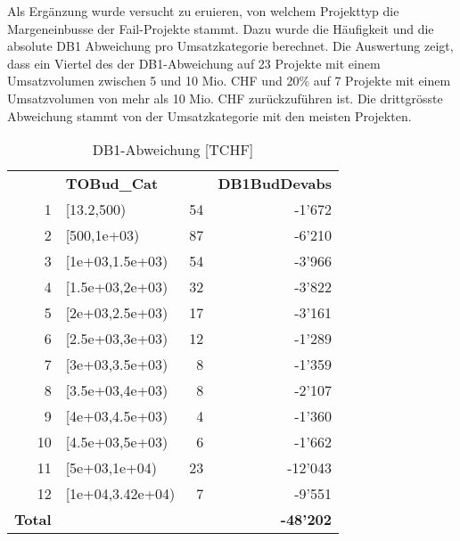Als Ergänzung wurde versucht zu eruieren, von welchem Projekttyp die Margeneinbusse der Fail-Projekte stammt. Dazu wurde die Häufigkeit und die absolute DB1 Abweichung pro Umsatzkategorie berechnet. Die Auswertung zeigt, dass ein Viertel des der DB1-Abweichung auf 23 Projekte mit einem Umsatzvolumen zwischen 5 und 10 Mio. CHF und 20\% auf 7 Projekte mit einem Umsatzvolumen von mehr als 10 Mio. CHF zurückzuführen ist. Die drittgrösste Abweichung stammt von der Umsatzkategorie mit den meisten Projekten.
\begin{table}[htbp]
	\centering
	\caption{DB1-Abweichung [TCHF]}
	\begin{tabular}{lrrr}
		& \multicolumn{1}{l}{\textbf{TOBud\_Cat}} &       & \multicolumn{1}{l}{\textbf{DB1BudDevabs}} \\
		\multicolumn{1}{r}{1} & \multicolumn{1}{l}{[13.2,500)} & 54    & -1'672 \\
		\multicolumn{1}{r}{2} & \multicolumn{1}{l}{[500,1e+03)} & 87    & -6'210 \\
		\multicolumn{1}{r}{3} & \multicolumn{1}{l}{[1e+03,1.5e+03)} & 54    & -3'966 \\
		\multicolumn{1}{r}{4} & \multicolumn{1}{l}{[1.5e+03,2e+03)} & 32    & -3'822 \\
		\multicolumn{1}{r}{5} & \multicolumn{1}{l}{[2e+03,2.5e+03)} & 17    & -3'161 \\
		\multicolumn{1}{r}{6} & \multicolumn{1}{l}{[2.5e+03,3e+03)} & 12    & -1'289 \\
		\multicolumn{1}{r}{7} & \multicolumn{1}{l}{[3e+03,3.5e+03)} & 8     & -1'359 \\
		\multicolumn{1}{r}{8} & \multicolumn{1}{l}{[3.5e+03,4e+03)} & 8     & -2'107 \\
		\multicolumn{1}{r}{9} & \multicolumn{1}{l}{[4e+03,4.5e+03)} & 4     & -1'360 \\
		\multicolumn{1}{r}{10} & \multicolumn{1}{l}{[4.5e+03,5e+03)} & 6     & -1'662 \\
		\multicolumn{1}{r}{11} & \multicolumn{1}{l}{[5e+03,1e+04)} & 23    & -12'043 \\
		\multicolumn{1}{r}{12} & \multicolumn{1}{l}{[1e+04,3.42e+04)} & 7     & -9'551 \\
		\textbf{Total} &       &       & \textbf{-48'202} \\
	\end{tabular}%
	\label{tab:addlabel}%
\end{table}%
